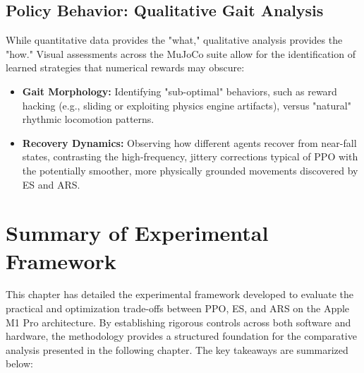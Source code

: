\subsection{Policy Behavior: Qualitative Gait Analysis}

While quantitative data provides the "what," qualitative analysis provides the "how." Visual assessments across the MuJoCo suite allow for the identification of learned strategies that numerical rewards may obscure:

\begin{itemize}
    \item \textbf{Gait Morphology:} Identifying "sub-optimal" behaviors, such as reward hacking (e.g., sliding or exploiting physics engine artifacts), versus "natural" rhythmic locomotion patterns.
    
    \item \textbf{Recovery Dynamics:} Observing how different agents recover from near-fall states, contrasting the high-frequency, jittery corrections typical of PPO with the potentially smoother, more physically grounded movements discovered by ES and ARS.
\end{itemize}

\section{Summary of Experimental Framework}

This chapter has detailed the experimental framework developed to evaluate the practical and optimization trade-offs between PPO, ES, and ARS on the Apple M1 Pro architecture. By establishing rigorous controls across both software and hardware, the methodology provides a structured foundation for the comparative analysis presented in the following chapter. The key takeaways are summarized below:

